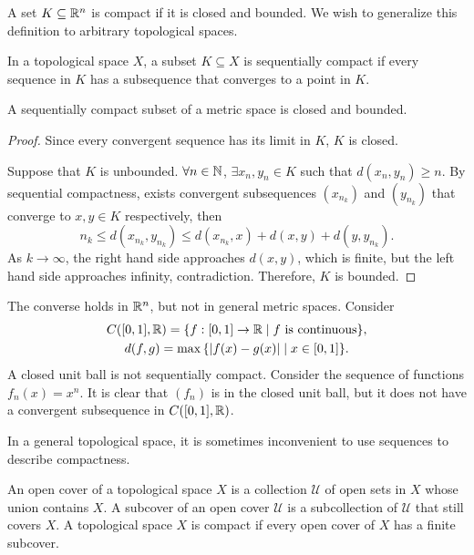 A set $K \subseteq {\mathbb R}^n$ is compact if it is closed and bounded. We wish to generalize this definition to arbitrary topological spaces.

\begin{df}
    In a topological space $X$, a subset $K\subseteq X$ is sequentially compact if every sequence in $K$ has a subsequence that converges to a point in $K$.
\end{df}

\begin{prop}
    A sequentially compact subset of a metric space is closed and bounded.
    \begin{proof}
        Since every convergent sequence has its limit in $K$, $K$ is closed.

        Suppose that $K$ is unbounded. $\forall n\in {\mathbb N}$, $\exists x_n, y_n \in K$ such that $d(x_n, y_n) \geq n$. By sequential compactness, exists convergent subsequences $(x_{n_k})$ and $(y_{n_k})$ that converge to $x, y \in K$ respectively, then
        \[
        n_k \leq d(x_{n_k}, y_{n_k}) \leq d(x_{n_k}, x) + d(x, y) + d(y, y_{n_k}).
        \]
        As $k\to\infty$, the right hand side approaches $d(x, y)$, which is finite, but the left hand side approaches infinity, contradiction. Therefore, $K$ is bounded.
    \end{proof}
\end{prop}

\begin{rmk}
    The converse holds in ${\mathbb R}^n$, but not in general metric spaces. Consider
    \begin{gather*}
        C([0, 1], {\mathbb R}) = {\left\{{f: [0, 1] \to {\mathbb R} \mid \text{$f$ is continuous}}\right\}}, \\
        d(f, g) = \max{\left\{{{\left| f(x) - g(x) \right|} \mid x\in [0, 1]}\right\}}.
    \end{gather*}
    A closed unit ball is not sequentially compact. Consider the sequence of functions $f_n(x) = x^n$. It is clear that $(f_n)$ is in the closed unit ball, but it does not have a convergent subsequence in $C([0, 1], {\mathbb R})$.
\end{rmk}

In a general topological space, it is sometimes inconvenient to use sequences to describe compactness. 

\begin{df}
    An open cover of a topological space $X$ is a collection $\mathcal U$ of open sets in $X$ whose union contains $X$. A subcover of an open cover $\mathcal U$ is a subcollection of $\mathcal U$ that still covers $X$. A topological space $X$ is compact if every open cover of $X$ has a finite subcover.
\end{df}

